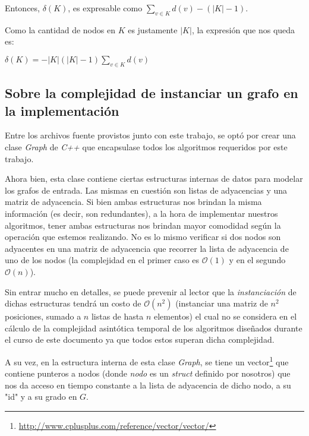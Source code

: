 \bigskip
\par Entonces, $\delta(K)$, es expresable como $\displaystyle\sum_{v \in K}d(v) - (|K|-1)$.
\bigskip

\par Como la cantidad de nodos en $K$ es justamente $|K|$, la expresi\'on
    que nos queda es:

\bigskip
\par $\delta(K) = -|K|(|K|-1)\displaystyle\sum_{v \in K}d(v)$
\bigskip

{}
\subsection*{Sobre la complejidad de instanciar un grafo en la implementaci\'on}
\par Entre los archivos fuente provistos junto con este trabajo, se opt\'o por
    crear una clase \emph{Graph} de \emph{C++} que encapsulase todos los algoritmos
    requeridos por este trabajo.

\par Ahora bien, esta clase contiene ciertas estructuras internas de datos
    para modelar los grafos de entrada. Las mismas en cuesti\'on son listas
    de adyacencias y una matriz de adyacencia. Si bien ambas estructuras nos
    brindan la misma informaci\'on (es decir, son redundantes), a la hora
    de implementar nuestros algoritmos, tener ambas estructuras nos brindan
    mayor comodidad seg\'un la operaci\'on que estemos realizando. No es lo
    mismo verificar si dos nodos son adyacentes en una matriz de adyacencia que
    recorrer la lista de adyacencia de uno de los nodos (la complejidad en
    el primer caso es $\mathcal O(1)$ y en el segundo $\mathcal O(n)$).

\par Sin entrar mucho en detalles, se puede prevenir al lector que la \emph{%
    instanciaci\'on} de dichas estructuras tendr\'a un costo de $\mathcal O%
    (n^2)$ (instanciar una matriz de $n^2$ posiciones, sumado a $n$ listas de
    hasta $n$ elementos) el cual no se considera en el c\'alculo de la complejidad
    asint\'otica temporal de los algoritmos dise\~nados durante el curso de este
    documento ya que todos estos superan dicha complejidad.

\par A su vez, en la estructura interna de esta clase \emph{Graph}, se tiene
    un vector\footnote{\url{http://www.cplusplus.com/reference/vector/vector/}}
    que contiene punteros a nodos (donde \emph{nodo} es un \emph{struct} definido
    por nosotros) que nos da acceso en tiempo constante a la lista de adyacencia
    de dicho nodo, a su "id" y a su grado en $G$.

